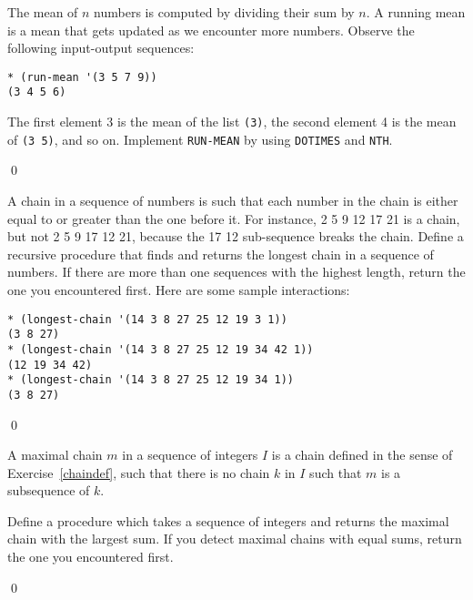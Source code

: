 \documentclass[a4paper,11pt]{article}
\begin{document}
% 

\begin{uexercise}
The mean of $n$ numbers is computed by dividing their sum by $n$. A running mean is a mean that gets updated as we encounter more numbers. Observe the following input-output sequences:

\begin{Verbatim}
* (run-mean '(3 5 7 9))
(3 4 5 6)
\end{Verbatim}

The first element 3 is the mean of the list \Verb+(3)+, the second element 4 is the mean of \Verb+(3 5)+, and so on. Implement \Verb+RUN-MEAN+ by using \Verb+DOTIMES+ and \Verb+NTH+.

\qed
\end{uexercise}

\begin{uexercise}
		\label{chaindef}

A chain in a sequence of numbers is such that each number in the chain is either equal to or greater than the one before it. For instance, 2 5 9 12 17 21 is a chain, but not 2 5 9 17 12 21, because the 17 12 sub-sequence breaks the chain. Define a recursive procedure that finds and returns the longest chain in a sequence of numbers. If there are more than one sequences with the highest length, return the one you encountered first. Here are some sample interactions:

\begin{Verbatim}
* (longest-chain '(14 3 8 27 25 12 19 3 1))
(3 8 27)
* (longest-chain '(14 3 8 27 25 12 19 34 42 1))
(12 19 34 42)
* (longest-chain '(14 3 8 27 25 12 19 34 1))
(3 8 27)
\end{Verbatim}

\qed
\end{uexercise}

\begin{uexercise}[*]

A maximal chain $m$ in a sequence of integers $I$ is a chain defined
in the sense of Exercise~\ref{chaindef}, such that there is no chain
$k$ in $I$ such that $m$ is a subsequence of $k$. 

Define a procedure which takes a sequence of integers and returns the
maximal chain with the largest sum. If you detect maximal chains with
equal sums, return the one you encountered first.

\qed
\end{uexercise}
\end{document}
